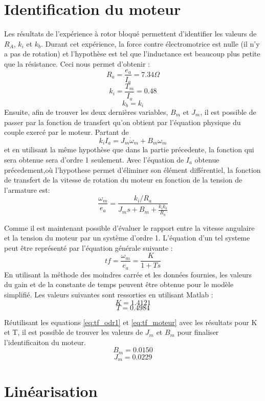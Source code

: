 \documentclass{udes_rapport} %
\begin{document}
\section{Identification du moteur}
Les résultats de l'expérience à rotor bloqué permettent d'identifier les valeurs de $R_A$, $k_i$ et $k_b$. Durant cet expérience, la force contre électromotrice est nulle (il n'y a pas de rotation) et l'hypothèse est tel que l'inductance est beaucoup plus petite que la résistance. Ceci nous permet d'obtenir :
\[	R_a = \frac{e_a}{I_a} = 7.34 \Omega	\]
\[	k_i = \frac{T_m}{I_a} =	0.48 		\]
\[	k_b = k_i							\]
Ensuite, afin de trouver les deux dernières variables, $B_m$ et $J_m$, il est possible de passer par la fonction de transfert qu'on obtient par l'équation physique du couple exercé par le moteur. Partant de 
\begin{equation}
k_i I_a = J_m \dot{\omega} _m + B_m \omega _m
\label{eq:torque}
\end{equation}
et en utilisant la même hypothèse que dans la partie précedente, la fonction qui sera obtenue sera d'ordre 1 seulement. Avec l'équation de $I_a$ obtenue précedement,où l'hypothese permet d'éliminer son élément différentiel, la fonction de transfert de la vitesse de rotation du moteur en fonction de la tension de l'armature est:
\begin{equation}
\frac{\omega_m}{e_a} = \frac{k_i/R_a}{J_m s + B_m + \frac{k_i k_b}{R_a}}
\label{eq:tf_moteur}
\end{equation}

Comme il est maintenant possible d'évaluer le rapport entre la vitesse angulaire et la tension du moteur par un système d'ordre 1. L'équation d'un tel systeme peut être représenté par l'équation générale suivante :
\begin{equation}
tf = \frac{\omega_m}{e_a} = \frac{K}{1+Ts}
\label{eq:tf_odr1}
\end{equation}
En utilisant la méthode des moindres carrée et les données fournies, les valeurs du gain et de la constante de temps peuvent être obtenue pour le modèle simplifié. Les valeurs suivantes sont ressorties en utilisant Matlab :
\[	K = 1.4121	\]
\[	T = 0.4984	\]

Réutilisant les equations \eqref{eq:tf_odr1} et \eqref{eq:tf_moteur} avec les résultats pour K et T, il est possible de trouver les valeurs de $J_m$ et $B_m$ pour finaliser l'identificaiton du moteur.
\[B_m = 0.0150	\]
\[J_m = 0.0229	\]
\section{Linéarisation}
\end{document}
